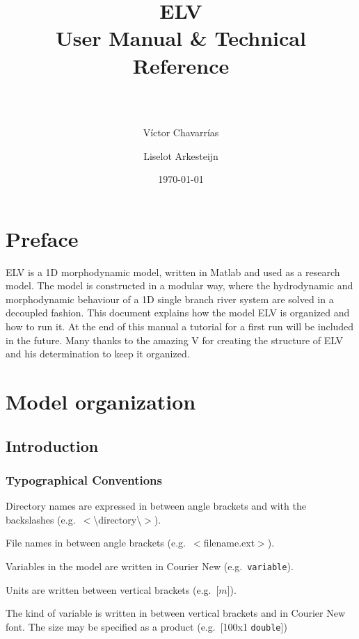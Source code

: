 \documentclass[a4paper, 11pt]{article}
\title{
\null
\vfill
\begin{flushright}
\huge{ELV}\\
\vspace{5mm}
\Large{User Manual \& Technical Reference}\\
\vspace{5mm}
\normalsize{\ttfamily{Version: \version}}\\
\vspace{5mm}
\end{flushright}
}
\date{\today}
\author[1]{V\'ictor Chavarr\'ias}
\author[1]{Liselot Arkesteijn}
\affil[1]{Delft University of Technology}
\newcommand{\pathfile}[1]{$<$#1$>$}
\newcommand{\pathdir}[1]{$<$\textbackslash#1\textbackslash$>$}
\begin{document}
%
%
%

\clearpage %
\maketitle
\thispagestyle{empty} %
\pagebreak
\tableofcontents
\clearpage
\pagebreak
%
%
%
%
%
%
\section*{Preface}
%
ELV is a 1D morphodynamic model, written in Matlab and used as a research model. The model is constructed in a modular way, where the hydrodynamic and morphodynamic behaviour of a 1D single branch river system are solved in a decoupled fashion. This document explains how the model ELV is organized and how to run it. At the end of this manual a tutorial for a first run will be included in the future. Many thanks to the amazing V for creating the structure of ELV and his determination to keep it organized.
\clearpage


%
\section{Model organization}
\subsection{Introduction}
\subsubsection{Typographical Conventions}
%
Directory names are expressed in between angle brackets and with the backslashes (e.g.\ \pathdir{directory}).

File names in between angle brackets (e.g.\ \pathfile{filename.ext}).

Variables in the model are written in Courier New (e.g.\ \texttt{variable}).

Units are written between vertical brackets (e.g.\ [$m$]).

The kind of variable is written in between vertical brackets and in Courier New font. The size may be specified as a product (e.g.\ [100x1 \texttt{double}])
\end{document}
